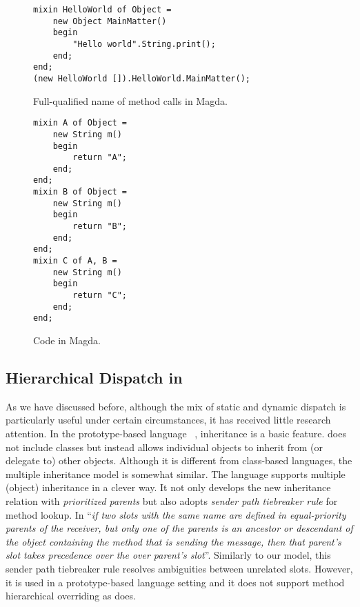 \begin{figure*}[t]
	\saveSpaceFig
	\begin{lstlisting}
mixin HelloWorld of Object =
	new Object MainMatter()
	begin
		"Hello world".String.print();
	end;
end;
(new HelloWorld []).HelloWorld.MainMatter();
	\end{lstlisting}
	\caption{Full-qualified name of method calls in Magda.}
	\label{fig:magda_prefix}
	\saveSpaceFig
\end{figure*}

\begin{figure*}[t]
	\saveSpaceFig
\begin{lstlisting}
mixin A of Object =
	new String m()
	begin
		return "A";
	end;
end; 
mixin B of Object = 
	new String m()
	begin
		return "B";
	end;
end;
mixin C of A, B = 
	new String m()
	begin
		return "C";
	end;
end;
\end{lstlisting}
	\caption{Code in Magda.}
	\label{fig:magda_code}
	\saveSpaceFig
\end{figure*}

\subsection{Hierarchical Dispatch in \self{}}
As we have discussed before, although the mix of static and dynamic dispatch is 
particularly useful under certain circumstances, it has received little research attention. 
In the prototype-based language \self{}~\cite{Chambers1991}, inheritance is a basic feature.
\self{} does not include classes but instead allows individual objects to inherit from (or delegate to) other objects. 
Although it is different from class-based languages, the multiple inheritance model is somewhat similar. The \self{}
language supports multiple (object) inheritance in a clever way. It not only develops the new inheritance
relation with \emph{prioritized parents} but also adopts \emph{sender path tiebreaker rule} for method lookup.
In \self{} ``\emph{if two slots with the same name are defined in equal-priority parents of the receiver, but only 
one of the parents is an ancestor or descendant of the object containing the method that is sending the message,
then that parent's slot takes precedence over the over parent's slot}''. 
Similarly to our model, this sender path tiebreaker rule resolves ambiguities between unrelated slots. However,
it is used in a prototype-based language setting and it does not support method hierarchical overriding as \MIM{} does.

